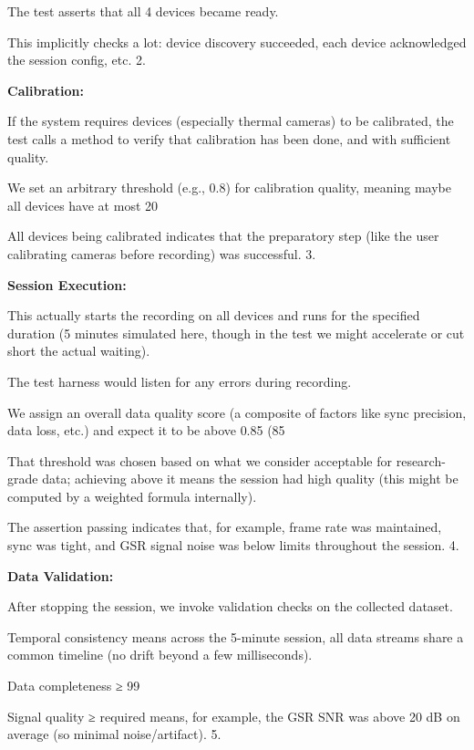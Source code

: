 {{{The test asserts that all 4 devices became ready.

This implicitly checks a lot: device discovery succeeded, each device acknowledged the session config, etc. 2.

\textbf{Calibration:}

If the system requires devices (especially thermal cameras) to be calibrated, the test calls a method to verify that calibration has been done, and with sufficient quality.

We set an arbitrary threshold (e.g., 0.8) for calibration quality, meaning maybe all devices have at most 20%

All devices being calibrated indicates that the preparatory step (like the user calibrating cameras before recording) was successful. 3.

\textbf{Session Execution:}

This actually starts the recording on all devices and runs for the specified duration (5 minutes simulated here, though in the test we might accelerate or cut short the actual waiting).

The test harness would listen for any errors during recording.

We assign an overall data quality score (a composite of factors like sync precision, data loss, etc.) and expect it to be above 0.85 (85%

That threshold was chosen based on what we consider acceptable for research-grade data; achieving above it means the session had high quality (this might be computed by a weighted formula internally).

The assertion passing indicates that, for example, frame rate was maintained, sync was tight, and GSR signal noise was below limits throughout the session. 4.

\textbf{Data Validation:}

After stopping the session, we invoke validation checks on the collected dataset.

Temporal consistency means across the 5-minute session, all data streams share a common timeline (no drift beyond a few milliseconds).

Data completeness ≥ 99%

Signal quality ≥ required means, for example, the GSR SNR was above 20 dB on average (so minimal noise/artifact). 5.

}}}
